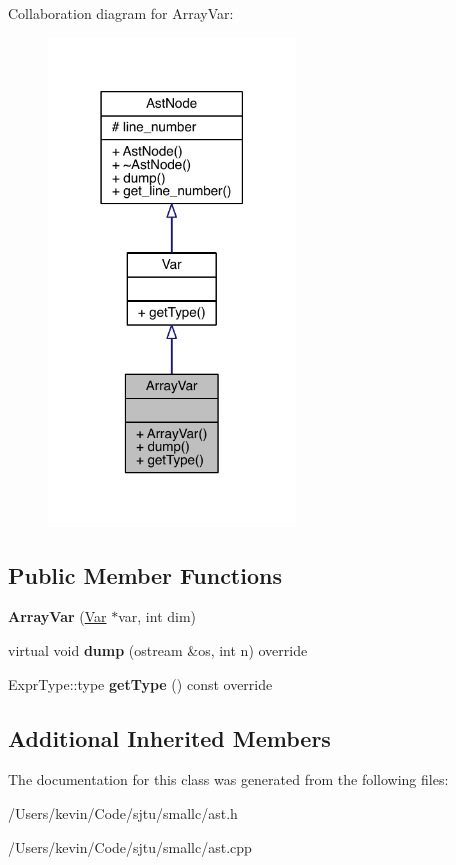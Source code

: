 Collaboration diagram for Array\+Var\+:\nopagebreak
\begin{figure}[H]
\begin{center}
\leavevmode
\includegraphics[width=186pt]{class_array_var__coll__graph}
\end{center}
\end{figure}
\subsection*{Public Member Functions}
\begin{DoxyCompactItemize}
\item 
\mbox{\label{class_array_var_a1c8b548e48e2e8861352bc09837d9200}} 
{\bfseries Array\+Var} (\hyperlink{class_var}{Var} $\ast$var, int dim)
\item 
\mbox{\label{class_array_var_ac5aa1eec61102a4fdbb1102518b70a1d}} 
virtual void {\bfseries dump} (ostream \&os, int n) override
\item 
\mbox{\label{class_array_var_aa1a9262ecdb395ec8fee2288bde1daf9}} 
Expr\+Type\+::type {\bfseries get\+Type} () const override
\end{DoxyCompactItemize}
\subsection*{Additional Inherited Members}


The documentation for this class was generated from the following files\+:\begin{DoxyCompactItemize}
\item 
/\+Users/kevin/\+Code/sjtu/smallc/ast.\+h\item 
/\+Users/kevin/\+Code/sjtu/smallc/ast.\+cpp\end{DoxyCompactItemize}
